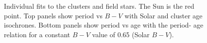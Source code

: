 \documentclass[useAMS, usenatbib]{mn2e}
\begin{document}
\begin{figure}
\begin{center}
    \end{center}
    \caption{ Individual fits to the clusters and field stars. The Sun is the
	    red point. Top panels show period vs $B-V$ with Solar and cluster
	    age isochrones. Bottom panels show period vs age with the period-
	    age relation for a constant $B-V$ value of 0.65 (Solar $B-V$).
\label{fig:subfigures1}}
\end{figure}
\end{document}
